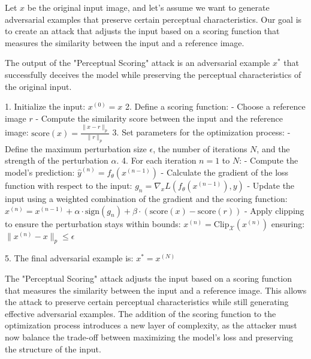 Let \( x \) be the original input image, and let's assume we want to generate adversarial examples that preserve certain perceptual characteristics. Our goal is to create an attack that adjusts the input based on a scoring function that measures the similarity between the input and a reference image.

The output of the "Perceptual Scoring" attack is an adversarial example \( x^* \) that successfully deceives the model while preserving the perceptual characteristics of the original input.


1. Initialize the input:
   $x^{(0)} = x$
2. Define a scoring function:
   - Choose a reference image \( r \)
   - Compute the similarity score between the input and the reference image: 
     $\text{score}(x) = \frac{\|x - r\|_p}{\|r\|_p}$
3. Set parameters for the optimization process:
   - Define the maximum perturbation size \( \epsilon \), the number of iterations \( N \), and the strength of the perturbation \( \alpha \).
4. For each iteration \( n = 1 \) to \( N \):
   - Compute the model's prediction:
   $\hat{y}^{(n)} = f_{\theta}(x^{(n-1)})$
   - Calculate the gradient of the loss function with respect to the input:
   $g_n = \nabla_x L(f_{\theta}(x^{(n-1)}), y)$
   - Update the input using a weighted combination of the gradient and the scoring function:
   $x^{(n)} = x^{(n-1)} + \alpha \cdot \text{sign}(g_n) + \beta \cdot (\text{score}(x) - \text{score}(r))$
   - Apply clipping to ensure the perturbation stays within bounds:
   $x^{(n)} = \text{Clip}_{\mathcal{X}}(x^{(n)})$
   ensuring:
   $\|x^{(n)} - x\|_p \leq \epsilon$

5. The final adversarial example is:
   $x^* = x^{(N)}$

The "Perceptual Scoring" attack adjusts the input based on a scoring function that measures the similarity between the input and a reference image. This allows the attack to preserve certain perceptual characteristics while still generating effective adversarial examples. The addition of the scoring function to the optimization process introduces a new layer of complexity, as the attacker must now balance the trade-off between maximizing the model's loss and preserving the structure of the input.